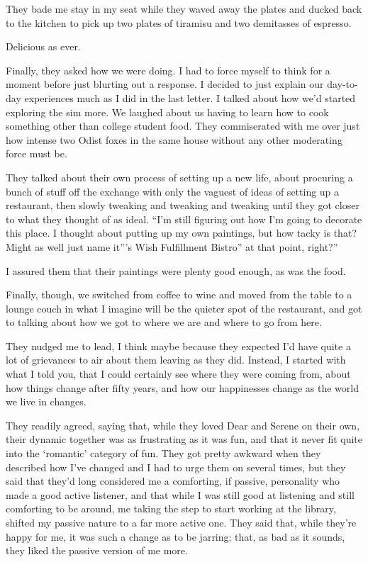 They bade me stay in my seat while they waved away the plates and ducked back to the kitchen to pick up two plates of tiramisu and two demitasses of espresso.

Delicious as ever.

Finally, they asked how we were doing. I had to force myself to think for a moment before just blurting out a response. I decided to just explain our day-to-day experiences much as I did in the last letter. I talked about how we'd started exploring the sim more. We laughed about us having to learn how to cook something other than college student food. They commiserated with me over just how intense two Odist foxes in the same house without any other moderating force must be.

They talked about their own process of setting up a new life, about procuring a bunch of stuff off the exchange with only the vaguest of ideas of setting up a restaurant, then slowly tweaking and tweaking and tweaking until they got closer to what they thought of as ideal. ``I'm still figuring out how I'm going to decorate this place. I thought about putting up my own paintings, but how tacky is that? Might as well just name it''\Partner 's Wish Fulfillment Bistro'' at that point, right?''

I assured them that their paintings were plenty good enough, as was the food.

Finally, though, we switched from coffee to wine and moved from the table to a lounge couch in what I imagine will be the quieter spot of the restaurant, and got to talking about how we got to where we are and where to go from here.

They nudged me to lead, I think maybe because they expected I'd have quite a lot of grievances to air about them leaving as they did. Instead, I started with what I told you, that I could certainly see where they were coming from, about how things change after fifty years, and how our happinesses change as the world we live in changes.

They readily agreed, saying that, while they loved Dear and Serene on their own, their dynamic together was as frustrating as it was fun, and that it never fit quite into the `romantic' category of fun. They got pretty awkward when they described how I've changed and I had to urge them on several times, but they said that they'd long considered me a comforting, if passive, personality who made a good active listener, and that while I was still good at listening and still comforting to be around, me taking the step to start working at the library, shifted my passive nature to a far more active one. They said that, while they're happy for me, it was such a change as to be jarring; that, as bad as it sounds, they liked the passive version of me more.

